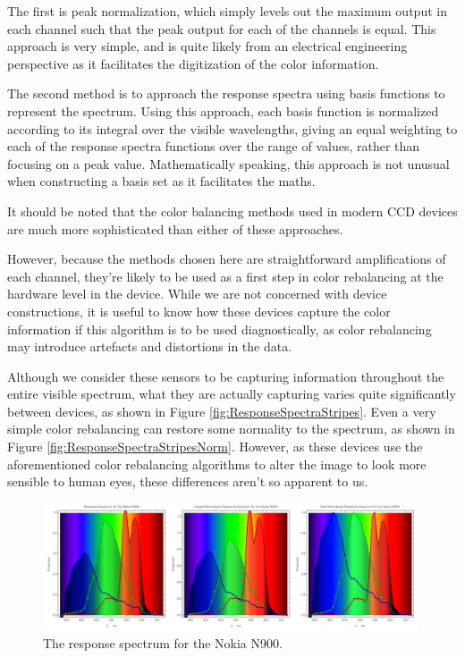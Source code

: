 The first is peak normalization, which simply levels out the maximum output in each channel such that the peak output for each of the channels is equal. This approach is very simple, and is quite likely from an electrical engineering perspective as it facilitates the digitization of the color information.

The second method is to approach the response spectra using basis functions to represent the spectrum. Using this approach, each basis function is normalized according to its integral over the visible wavelengths, giving an equal weighting to each of the response spectra functions over the range of values, rather than focusing on a peak value. Mathematically speaking, this approach is not unusual when constructing a basis set as it facilitates the maths.

It should be noted that the color balancing methods used in modern CCD devices are much more sophisticated than either of these approaches.

However, because the methods chosen here are straightforward amplifications of each channel, they're likely to be used as a first step in color rebalancing at the hardware level in the device. While we are not concerned with device constructions, it is useful to know how these devices capture the color information if this algorithm is to be used diagnostically, as color rebalancing may introduce artefacts and distortions in the data.

Although we consider these sensors to be capturing information throughout the entire visible spectrum, what they are actually capturing varies quite significantly between devices, as shown in Figure \ref{fig:ResponseSpectraStripes}. Even a very simple color rebalancing can restore some normality to the spectrum, as shown in Figure \ref{fig:ResponseSpectraStripesNorm}. However, as these devices use the aforementioned color rebalancing algorithms to alter the image to look more sensible to human eyes, these differences aren't so apparent to us.

\clearpage

\begin{figure}[h!]
  \centering
    \includegraphics[width=0.99\textwidth]{Chapter1/Figs/ResponseSpectrum_NokiaN900.jpg}
    \caption{The response spectrum for the Nokia N900. }  \label{fig:ResponseSpectumNokia}
\end{figure}

